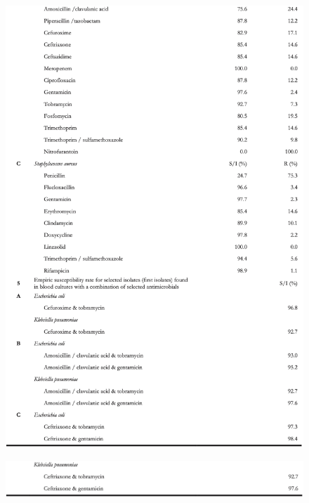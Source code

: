 \documentclass[
]{book}
\begin{document}
\begin{figure}

{\centering \includegraphics[width=1\linewidth]{images/06-ta01b} 

}

\end{figure}
\begin{figure}

{\centering \includegraphics[width=1\linewidth]{images/06-ta01c} 

}

\end{figure}
\end{document}

